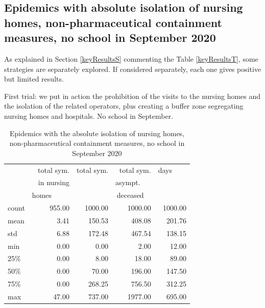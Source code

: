 \documentclass[11pt]{article}
\begin{document}
\subsection{Epidemics with absolute isolation of nursing homes, non-pharmaceutical containment measures, no school in September 2020}
\label{EpidemicsNHsS}

As explained in Section \ref{keyResultsS} commenting the Table \ref{keyResultsT}, some strategies are separately explored. If considered separately, each one gives positive but limited results. 

First trial: we put in action the prohibition of the visits to the nursing homes and the isolation of the related operators, plus creating a buffer zone segregating nursing homes and hospitals. No school in September.

\begin{table}[H]
\center
\small
\begin{tabular}{lrrrr}
\toprule
{} & total sym.        &  total sym. & total sym.     & days~~~~ \\
{} & in nursing        &                  & asympt.~~~  & \\
{} & homes~~~~~  &                  & deceased~~ & \\
\midrule
count &     955.00 &             1000.00 &                 1000.00 & 1000.00 \\
mean  &       3.41 &              150.53 &                  408.08 &  201.76 \\
std   &       6.88 &              172.48 &                  467.54 &  138.15 \\
min   &       0.00 &                0.00 &                    2.00 &   12.00 \\
25\%   &       0.00 &                8.00 &                   18.00 &   89.00 \\
50\%   &       0.00 &               70.00 &                  196.00 &  147.50 \\
75\%   &       0.00 &              268.25 &                  756.50 &  312.25 \\
max   &      47.00 &              737.00 &                 1977.00 &  695.00 \\
\bottomrule
\end{tabular}

\label{EpidemicsNHsT}
\caption{Epidemics with the absolute isolation of nursing homes, non-pharmaceutical containment measures, no school in September 2020}
\end{table}
\end{document}
